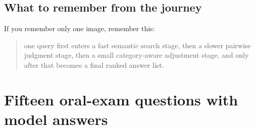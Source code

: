 \documentclass[10pt]{article}
\begin{document}
\subsection*{What to remember from the journey}

If you remember only one image, remember this:
\begin{quote}
one query first enters a fast semantic search stage, then a slower pairwise judgment stage, then a small category-aware adjustment stage, and only after that becomes a final ranked answer list.
\end{quote}

\section{Fifteen oral-exam questions with model answers}
\end{document}
